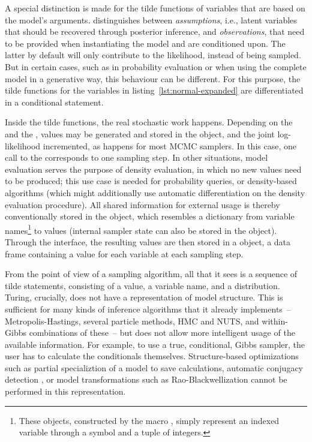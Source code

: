 A special distinction is made for the tilde functions of variables that are based on the model's
arguments. \dppljl{} distinguishes between \emph{assumptions}, i.e., latent variables that should be
recovered through posterior inference, and \emph{observations}, that need to be provided when
instantiating the model and are conditioned upon.  The latter by default will only contribute to the
likelihood, instead of being sampled.  But in certain cases, such as in probability evaluation or
when using the complete model in a generative way, this behaviour can be different.  For this
purpose, the tilde functions for the variables  in listing~\ref{lst:normal-expanded} are
differentiated in a conditional statement.

Inside the tilde functions, the real stochastic work happens.  Depending on the  and
the , values may be generated and stored in the  object, and the joint
log-likelihood incremented, as happens for most MCMC samplers.  In this case, one call to the
 corresponds to one sampling step.  In other situations, model evaluation serves
the purpose of density evaluation, in which no new values need to be produced; this use case is
needed for probability queries, or density-based algorithms (which might additionally use automatic
differentiation on the density evaluation procedure).  All shared information for external usage is
thereby conventionally stored in the  object, which resembles a dictionary from
variable names\footnote{These  objects, constructed by the macro ,
  simply represent an indexed variable through a symbol and a tuple of integers.}  to values
(internal sampler state can also be stored in the  object).  Through the
 interface, the resulting values are then stored in a  object, a data
frame containing a value for each variable at each sampling step.

From the point of view of a sampling algorithm, all that it sees is a sequence of tilde statements,
consisting of a value, a variable name, and a distribution.  Turing, crucially, does not have a
representation of model structure.  This is sufficient for many kinds of inference algorithms that
it already implements~-- Metropolis-Hastings, several particle methods, HMC and NUTS, and
within-Gibbs combinations of these~-- but does not allow more intelligent usage of the available
information.  For example, to use a true, conditional, Gibbs sampler, the user has to calculate the
conditionals themselves.  Structure-based optimizations such as partial specializtion of a model to
save calculations, automatic conjugacy detection \parencite{hoffman2018autoconj}, or model
transformations such as Rao-Blackwellization \parencite{murray2017delayed} cannot be performed in
this representation.


